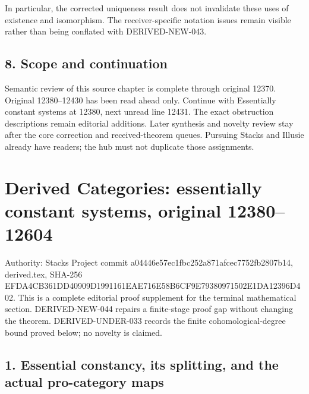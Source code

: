 \documentclass[11pt]{article}
\begin{document}
In particular,\allowbreak{} the corrected uniqueness result does not invalidate these uses of existence and isomorphism. The receiver-specific notation issues remain visible rather than being conflated with DERIVED-NEW-043.

\subsection{8. Scope and continuation}\label{proofs-12008-12370-scope-and-continuation}

Semantic review of this source chapter is complete through original 12370. Original 12380–\allowbreak{}12430 has been read ahead only. Continue with Essentially constant systems at 12380,\allowbreak{} next unread line 12431. The exact obstruction descriptions remain editorial additions. Later synthesis and novelty review stay after the core correction and received-theorem queues. Pursuing Stacks and Illusie already have readers; the hub must not duplicate those assignments.
\clearpage
\section{\texorpdfstring{Derived Categories:\allowbreak{} essentially constant systems,\allowbreak{} original 12380–\allowbreak{}12604}{Derived  essentially constant  original }}\label{proofs-12380-12604-derived-categories-essentially-constant-systems-original-1238012604}

Authority:\allowbreak{} Stacks Project commit a04446e5\allowbreak{}7ec1fbc2\allowbreak{}52a871af\allowbreak{}cec7752f\allowbreak{}b2807b14, derived.tex,\allowbreak{} SHA-256 EFDA4CB3\allowbreak{}61DD4090\allowbreak{}9D199116\allowbreak{}1EAE716E\allowbreak{}58B6CF9E\allowbreak{}79380971\allowbreak{}502E1DA1\allowbreak{}2396D402. This is a complete editorial proof supplement for the terminal mathematical section. DERIVED-NEW-044 repairs a finite-stage proof gap without changing the theorem. DERIVED-UNDER-033 records the finite cohomological-degree bound proved below; no novelty is claimed.

\subsection{\texorpdfstring{1. Essential constancy,\allowbreak{} its splitting,\allowbreak{} and the actual pro-category maps}{1. Essential  its  and the actual pro-category maps}}\label{proofs-12380-12604-essential-constancy-its-splitting-and-the-actual-pro-category-maps}
\end{document}
